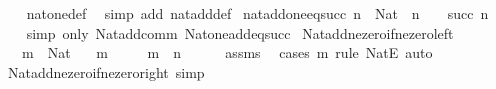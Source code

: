 \begin{isabellebody}
%
\isadelimproof
\ \ %
\endisadelimproof
%
\isatagproof
{}\isamarkupfalse%
\ nat{\isacharunderscore}{\kern0pt}one{\isacharunderscore}{\kern0pt}def\ \isamarkupfalse%
\ {\isacharparenleft}{\kern0pt}simp\ add{\isacharcolon}{\kern0pt}\ nat{\isacharunderscore}{\kern0pt}add{\isacharunderscore}{\kern0pt}def{\isacharparenright}{\kern0pt}%
\endisatagproof
{\isafoldproof}%
%
\isadelimproof
\isanewline
%
\endisadelimproof
\isanewline
{}\isamarkupfalse%
\ nat{\isacharunderscore}{\kern0pt}add{\isacharunderscore}{\kern0pt}one{\isacharunderscore}{\kern0pt}eq{\isacharunderscore}{\kern0pt}succ{\isacharcolon}{\kern0pt}\ {\isachardoublequoteopen}n\ {\isacharcolon}{\kern0pt}\ Nat\ {\isasymLongrightarrow}\ n\ {\isacharplus}{\kern0pt}\ {}\ {\isacharequal}{\kern0pt}\ succ\ n{\isachardoublequoteclose}\isanewline
%
\isadelimproof
\ \ %
\endisadelimproof
%
\isatagproof
{}\isamarkupfalse%
\ {\isacharparenleft}{\kern0pt}simp\ only{\isacharcolon}{\kern0pt}\ Nat{\isacharunderscore}{\kern0pt}add{\isacharunderscore}{\kern0pt}comm\ Nat{\isacharunderscore}{\kern0pt}one{\isacharunderscore}{\kern0pt}add{\isacharunderscore}{\kern0pt}eq{\isacharunderscore}{\kern0pt}succ{\isacharparenright}{\kern0pt}%
\endisatagproof
{\isafoldproof}%
%
\isadelimproof
\isanewline
%
\endisadelimproof
\isanewline
{}\isamarkupfalse%
\ Nat{\isacharunderscore}{\kern0pt}add{\isacharunderscore}{\kern0pt}ne{\isacharunderscore}{\kern0pt}zero{\isacharunderscore}{\kern0pt}if{\isacharunderscore}{\kern0pt}ne{\isacharunderscore}{\kern0pt}zero{\isacharunderscore}{\kern0pt}left{\isacharcolon}{\kern0pt}\isanewline
\ \ \ {\isachardoublequoteopen}m\ {\isacharcolon}{\kern0pt}\ Nat{\isachardoublequoteclose}\isanewline
\ \ \ {\isachardoublequoteopen}m\ {\isasymnoteq}\ {}{\isachardoublequoteclose}\isanewline
\ \ \ {\isachardoublequoteopen}m\ {\isacharplus}{\kern0pt}\ n\ {\isasymnoteq}\ {}{\isachardoublequoteclose}\isanewline
%
\isadelimproof
\ \ %
\endisadelimproof
%
\isatagproof
{}\isamarkupfalse%
\ assms\ \isamarkupfalse%
\ {\isacharparenleft}{\kern0pt}cases\ m\ rule{\isacharcolon}{\kern0pt}\ NatE{\isacharparenright}{\kern0pt}\ auto%
\endisatagproof
{\isafoldproof}%
%
\isadelimproof
\isanewline
%
\endisadelimproof
\isanewline
{}\isamarkupfalse%
\ Nat{\isacharunderscore}{\kern0pt}add{\isacharunderscore}{\kern0pt}ne{\isacharunderscore}{\kern0pt}zero{\isacharunderscore}{\kern0pt}if{\isacharunderscore}{\kern0pt}ne{\isacharunderscore}{\kern0pt}zero{\isacharunderscore}{\kern0pt}right\ {\isacharbrackleft}{\kern0pt}simp{\isacharbrackright}{\kern0pt}{\isacharcolon}{\kern0pt}\isanewline

\end{isabellebody}
